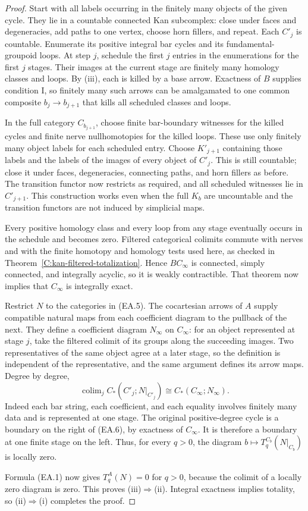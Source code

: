 \begin{proof}
Start with all labels occurring in the finitely many objects
of the given cycle. They lie in a countable connected Kan
subcomplex: close under faces and degeneracies, add paths to
one vertex, choose horn fillers, and repeat. Each $C'_j$ is
countable. Enumerate its positive integral bar cycles and
its fundamental-groupoid loops. At step $j$, schedule the
first $j$ entries in the enumerations for the first $j$
stages. Their images at the current stage are finitely many
homology classes and loops. By (iii), each is killed by a
base arrow. Exactness of $B$ supplies condition I, so finitely
many such arrows can be amalgamated to one common composite
$b_j\to b_{j+1}$ that kills all scheduled classes and loops.

In the full category $C_{b_{j+1}}$, choose finite bar-boundary
witnesses for the killed cycles and finite nerve nullhomotopies
for the killed loops. These use only finitely many object
labels for each scheduled entry. Choose $K'_{j+1}$ containing
those labels and the labels of the images of every object of
$C'_j$. This is still countable; close it under faces,
degeneracies, connecting paths, and horn fillers as before.
The transition functor now restricts as required, and all
scheduled witnesses lie in $C'_{j+1}$. This construction works
even when the full $K_b$ are uncountable and the transition
functors are not induced by simplicial maps.

Every positive homology class and every loop from any stage
eventually occurs in the schedule and becomes zero. Filtered
categorical colimits commute with nerves and with the finite
homotopy and homology tests used here, as checked in
Theorem~\ref{C:kan-filtered-totalization}. Hence $BC_\infty$
is connected, simply connected, and integrally acyclic, so it
is weakly contractible. That theorem now implies that
$C_\infty$ is integrally exact.

Restrict $N$ to the categories in (EA.5). The cocartesian arrows
of $A$ supply compatible natural maps from each coefficient
diagram to the pullback of the next. They define a coefficient
diagram $N_\infty$ on $C_\infty$: for an object represented
at stage $j$, take the filtered colimit of its groups along
the succeeding images. Two representatives of the same object
agree at a later stage, so the definition is independent of
the representative, and the same argument defines its arrow
maps. Degree by degree,
\[
 \operatorname{colim}_j
    C_*(C'_j;N|_{C'_j})
       \cong C_*(C_\infty;N_\infty).
 \tag{EA.6}
\]
Indeed each bar string, each coefficient, and each equality
involves finitely many data and is represented at one stage.
The original positive-degree cycle is a boundary on the right
of (EA.6), by exactness of $C_\infty$. It is therefore a
boundary at one finite stage on the left. Thus, for every
$q>0$, the diagram $b\mapsto T_q^{C_b}(N|_{C_b})$ is locally
zero.

Formula (EA.1) now gives $T_q^A(N)=0$ for $q>0$, because
the colimit of a locally zero diagram is zero. This proves
(iii)$\Rightarrow$(ii). Integral exactness implies totality,
so (ii)$\Rightarrow$(i) completes the proof.
\end{proof}
